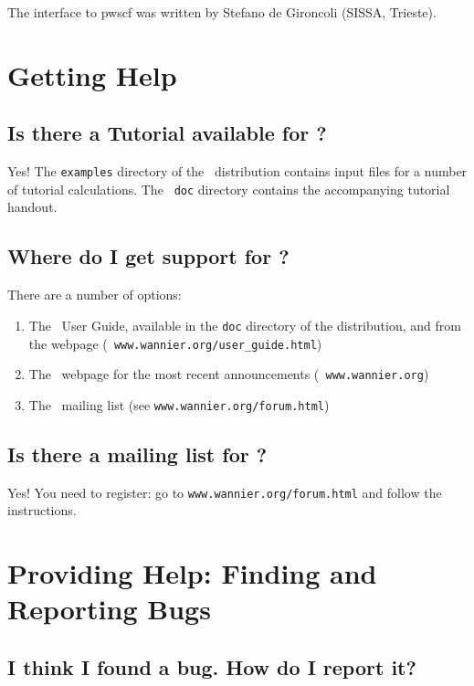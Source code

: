 The interface to {\sc pwscf} was written by Stefano de Gironcoli
(SISSA, Trieste). 

\section{Getting Help}

\subsection{Is there a Tutorial available for \wannier?}

Yes! The {\tt examples} directory of the \wannier\ distribution
contains input files for a number of tutorial calculations. The {\tt
  doc} directory contains the accompanying tutorial handout. 

\subsection{Where do I get support for \wannier?}

There are a number of options:

\begin{enumerate}
\item The \wannier\ User Guide, available in the {\tt doc} directory of the
  distribution, and from the webpage ({\tt
  www.wannier.org/user\_guide.html})
\item The \wannier\ webpage for the most recent announcements ({\tt
  www.wannier.org})
\item The \wannier\ mailing list (see {\tt www.wannier.org/forum.html})
\end{enumerate}

\subsection{Is there a mailing list for \wannier?}

Yes! You need to register: go to {\tt www.wannier.org/forum.html} and
follow the instructions. 

\section{Providing Help: Finding and Reporting Bugs}

\subsection{I think I found a bug. How do I report it?}

